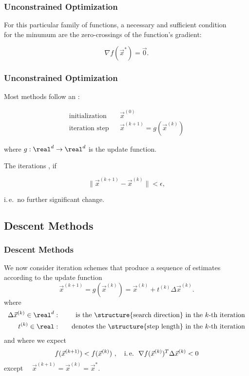 \begin{frame}
  \frametitle{Unconstrained Optimization \cont}
  
  For this particular family of functions, a necessary and sufficient condition \\
  for the  minumum are the zero-crossings of the function's gradient:
  
  \begin{displaymath}
    \nabla f(\vec x^*) = \vec 0.
  \end{displaymath}
\end{frame}


\begin{frame}
  \frametitle{Unconstrained Optimization \cont}

  Most methods follow an :

  \begin{eqnarray*}
    \mbox{initialization} & & \vec x ^{(0)}\\
    \mbox{iteration step} & & \vec x^{(k+1)}= g(\vec x^{(k)}) 
  \end{eqnarray*}

  where $g: \real^d\rightarrow \real^d$ is the update function. \\[0.5cm] \pause

  The iterations , if 
  
  \begin{displaymath}
    \|\vec x^{(k+1)} - \vec x^{(k)}\| < \epsilon,
  \end{displaymath}
  
  i.\,e.\ no further significant change.
\end{frame}


\subsection{Descent Methods}

\begin{frame}

  \frametitle{Descent Methods}

  We now consider iteration schemes that produce a sequence of estimates \\
  according to the update function
%  
  \begin{displaymath}
    \vec x^{(k+1)} = g(\vec x^{(k)}) = \vec x^{(k)} + t^{(k)}\Delta \vec x^{(k)} .
  \end{displaymath}
%  
  where 
%  
  \begin{eqnarray*}
    \Delta \vec x^{(k)}\in \real ^d: & & \quad \mbox{is the \structure{search direction} in the $k$-th iteration}\\
    t^{(k)}\in \real:                & & \quad \mbox{denotes the \structure{step length} in the $k$-th iteration}
  \end{eqnarray*}
  \pause
%  
  and where we expect 
%  
  \begin{displaymath}
    f( \vec x^{(k+1)} ) < f(\vec x^{(k)}) ~, \quad \mbox{i.\,e.}~~ \nabla f(\vec x^{(k)})^T \Delta \vec x^{(k)} < 0
  \end{displaymath}
%  
  except ~~$ \vec x^{(k+1)}=\vec x^{(k)}=\vec x^*$.
\end{frame}


